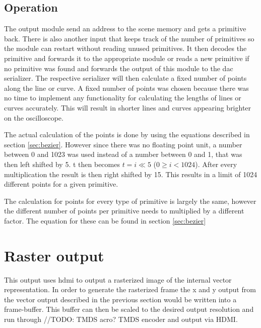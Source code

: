 \subsection{Operation}

The output module send an address to the scene memory and gets a primitive back.
There is also another input that keeps track of the number of primitives so the module can restart without reading unused primitives.
It then decodes the primitive and forwards it to the appropriate module or reads a new primitive if no primitive was found and forwards the output of this module to the \gls{dac} serializer.
The respective serializer will then calculate a fixed number of points along the line or curve.
A fixed number of points was chosen because there was no time to implement any functionality for calculating the lengths of lines or curves accurately.
This will result in shorter lines and curves appearing brighter on the oscilloscope.

The actual calculation of the points is done by using the equations described in section \ref{sec:bezier}.
However since there was no floating point unit, a number between 0 and 1023 was used instead of a number between 0 and 1, that was then left shifted by 5.
t then becomes \(t = i \ll 5\) (\(0 \geq i < 1024\)).
After every multiplication the result is then right shifted by 15.
This results in a limit of 1024 different points for a given primitive.

The calculation for points for every type of primitive is largely the same, however the different number of points per primitive needs to multiplied by a different factor.
The equation for these can be found in section \ref{sec:bezier}

\section{Raster output}

This output uses \gls{hdmi} to output a rasterized image of the internal vector representation.
In order to generate the rasterized frame the x and y output from the vector output described in the previous section would be written into a frame-buffer.
This buffer can then be scaled to the desired output resolution and run through //TODO: TMDS acro? TMDS encoder and output via HDMI.
